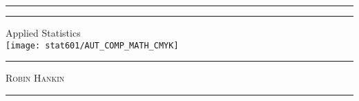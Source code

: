 \begin{titlepage} %

	\centering %
	\rule{\textwidth}{1pt} %
	\vspace{2pt}\vspace{-\baselineskip} %
	\rule{\textwidth}{0.4pt} %

	\vspace{0.1\textheight} %

		{\Huge Applied Statistics}\\[0.5\baselineskip] %

        \texttt{[image: stat601/AUT\_COMP\_MATH\_CMYK]}

	\vspace{0.025\textheight} %

	\rule{0.3\textwidth}{0.4pt} %

	\vspace{0.1\textheight} %

	{\Large \textsc{Robin Hankin}} %

	\vspace{0.1\textheight} %
	\rule{\textwidth}{0.4pt} %

\end{titlepage}


